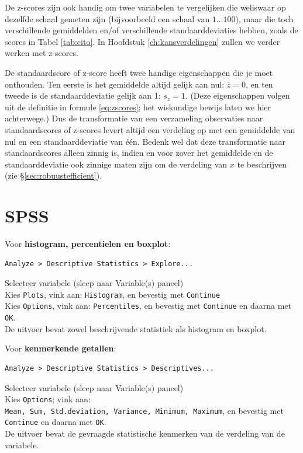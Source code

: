 \documentclass[
]{book}
\begin{document}
De z-scores zijn ook handig om twee variabelen te vergelijken die
weliswaar op dezelfde schaal gemeten zijn (bijvoorbeeld een schaal van
\(1 \dots 100\)), maar die toch verschillende gemiddelden en/of
verschillende standaarddeviaties hebben, zoals de scores in
Tabel \ref{tab:cito}.
In Hoofdstuk \ref{ch:kansverdelingen} zullen we verder werken met z-scores.

De standaardscore of z-score heeft twee handige eigenschappen die je
moet onthouden. Ten eerste is het gemiddelde altijd gelijk aan nul:
\(\overline{z}=0\), en ten tweede is de standaarddeviatie gelijk aan 1:
\(s_z = 1\). (Deze eigenschappen volgen uit de definitie in
formule \eqref{eq:zscores}; het wiskundige bewijs laten we hier
achterwege.) Dus de transformatie van een verzameling observaties naar
standaardscores of z-scores levert altijd een verdeling op met een
gemiddelde van nul en een standaarddeviatie van één. Bedenk wel dat deze
transformatie naar standaardscores alleen zinnig is, indien en voor
zover het gemiddelde en de standaarddeviatie ook zinnige maten zijn om
de verdeling van \(x\) te beschrijven (zie §\ref{sec:robuustefficient}).

\hypertarget{spss-3}{%
\section{SPSS}\label{spss-3}}

Voor \textbf{histogram, percentielen en boxplot}:

\begin{verbatim}
Analyze > Descriptive Statistics > Explore...
\end{verbatim}

Selecteer variabele (sleep naar Variable(s) paneel)\\
Kies \texttt{Plots}, vink aan: \texttt{Histogram}, en bevestig met \texttt{Continue}\\
Kies \texttt{Options}, vink aan: \texttt{Percentiles}, en bevestig met \texttt{Continue} en
daarna met \texttt{OK}.\\
De uitvoer bevat zowel beschrijvende statistiek als histogram en
boxplot.

Voor \textbf{kenmerkende getallen}:\\

\begin{verbatim}
Analyze > Descriptive Statistics > Descriptives...
\end{verbatim}

Selecteer variabele (sleep naar Variable(s) paneel)\\
Kies \texttt{Options}; vink aan:
\texttt{Mean,\ Sum,\ Std.deviation,\ Variance,\ Minimum,\ Maximum}, en bevestig met
\texttt{Continue} en daarna met \texttt{OK}.\\
De uitvoer bevat de gevraagde statistische kenmerken van de verdeling
van de variabele.\\
\end{document}
